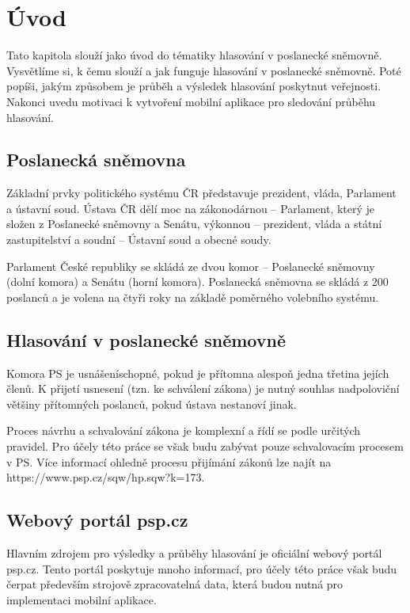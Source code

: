 \chapter{Úvod}

\setcounter{page}{1}

\begin{chapterabstract}
	Tato kapitola slouží jako úvod do tématiky hlasování v poslanecké sněmovně. Vysvětlíme si, k čemu slouží a jak funguje hlasování v poslanecké sněmovně. Poté popíši, jakým způsobem je průběh a výsledek hlasování poskytnut veřejnosti. Nakonci uvedu motivaci k vytvoření mobilní aplikace pro sledování průběhu hlasování.
\end{chapterabstract}

\section{Poslanecká sněmovna}
Základní prvky politického systému ČR představuje prezident, vláda, Parlament a ústavní soud. Ústava ČR dělí moc na zákonodárnou – Parlament, který je složen z Poslanecké sněmovny a Senátu, výkonnou – prezident, vláda a státní zastupitelství a soudní – Ústavní soud a obecné soudy. \cite{Husek2019-p40}

Parlament České republiky se skládá ze dvou komor – Poslanecké sněmovny (dolní komora) a Senátu (horní komora). Poslanecká sněmovna se skládá z 200 poslanců a je volena na čtyři roky na základě poměrného volebního systému.\cite{Husek2019-p40}

\section{Hlasování v poslanecké sněmovně}
Komora PS je usnášeníschopné, pokud je přítomna alespoň jedna třetina jejích členů. K přijetí usnesení (tzn. ke schválení zákona) je nutný souhlas nadpoloviční většiny přítomných poslanců, pokud ústava nestanoví jinak. \cite{Husek2019-p40}

Proces návrhu a schvalování zákona je komplexní a řídí se podle určitých pravidel. Pro účely této práce se však budu zabývat pouze schvalovacím procesem v PS. Více informací ohledně procesu přijímání zákonů lze najít na https://www.psp.cz/sqw/hp.sqw?k=173.
	

\section{Webový portál psp.cz}
Hlavním zdrojem pro výsledky a průběhy hlasování je oficiální webový portál psp.cz. Tento portál poskytuje mnoho informací, pro účely této práce však budu čerpat především strojově zpracovatelná data, která budou nutná pro implementaci mobilní aplikace.


